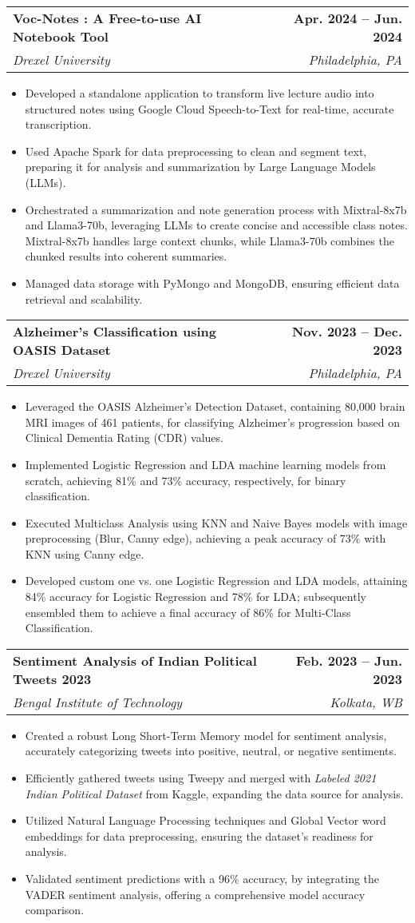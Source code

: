 \documentclass[letterpaper,10pt]{article}
\makeatletter
\newcommand{\resumeItem}[1]{
  \item\small{
    {#1 \vspace{-5pt}}
  }
}
\newcommand{\resumeSubheading}[4]{
  \vspace{0pt}\item
    \begin{tabular*}{0.97\textwidth}[t]{l@{\extracolsep{\fill}}r}
      \textbf{#1} & \textbf{#2} \\
      \textit{\small#3} & \textit{\small #4} \\
    \end{tabular*}\vspace{-10pt}
}
\newcommand{\resumeItemListStart}{\begin{itemize}}
\newcommand{\resumeItemListEnd}{\end{itemize}\vspace{-5pt}}
\makeatother
\begin{document}
    \resumeSubheading
    {Voc-Notes  : A Free-to-use AI Notebook Tool}{Apr. 2024 -- Jun. 2024}
    {Drexel University}{Philadelphia, PA}
    \resumeItemListStart
      \resumeItem{Developed a standalone application to transform live lecture audio into structured notes using Google Cloud Speech-to-Text for real-time, accurate transcription.}
      \resumeItem{Used Apache Spark for data preprocessing to clean and segment text, preparing it for analysis and summarization by Large Language Models (LLMs).}
      \resumeItem{Orchestrated a summarization and note generation process with Mixtral-8x7b and Llama3-70b, leveraging LLMs to create concise and accessible class notes. Mixtral-8x7b handles large context chunks, while Llama3-70b combines the chunked results into coherent summaries.}
      \resumeItem{Managed data storage with PyMongo and MongoDB, ensuring efficient data retrieval and scalability.}
    \resumeItemListEnd

    \resumeSubheading
    {Alzheimer's Classification using OASIS Dataset}{Nov. 2023 -- Dec. 2023}
    {Drexel University}{Philadelphia, PA}
    \resumeItemListStart
      \resumeItem{Leveraged the OASIS Alzheimer's Detection Dataset, containing 80,000 brain MRI images of 461 patients, for classifying Alzheimer's progression based on Clinical Dementia Rating (CDR) values.}
      \resumeItem{Implemented Logistic Regression and LDA machine learning models from scratch, achieving 81\% and 73\% accuracy, respectively, for binary classification.}
      \resumeItem{Executed Multiclass Analysis using KNN and Naive Bayes models with image preprocessing (Blur, Canny edge), achieving a peak accuracy of 73\% with KNN using Canny edge.}
      \resumeItem{Developed custom one vs. one Logistic Regression and LDA models, attaining 84\% accuracy for Logistic Regression and 78\% for LDA; subsequently ensembled them to achieve a final accuracy of 86\% for Multi-Class Classification.}
    \resumeItemListEnd
      
    \resumeSubheading
    {Sentiment Analysis of Indian Political Tweets 2023}{Feb. 2023 -- Jun. 2023}
    {Bengal Institute of Technology}{Kolkata, WB}
    \resumeItemListStart
      \resumeItem{Created a robust Long Short-Term Memory model for sentiment analysis, accurately categorizing tweets into positive, neutral, or negative sentiments.}
      \resumeItem{Efficiently gathered tweets using Tweepy and merged with \emph{Labeled 2021 Indian Political Dataset} from Kaggle, expanding the data source for analysis.}
      \resumeItem{Utilized Natural Language Processing techniques and Global Vector word embeddings for data preprocessing, ensuring the dataset's readiness for analysis.}
      \resumeItem{Validated sentiment predictions with a 96\% accuracy, by integrating the VADER sentiment analysis, offering a comprehensive model accuracy comparison.}
    \resumeItemListEnd
\end{document}

